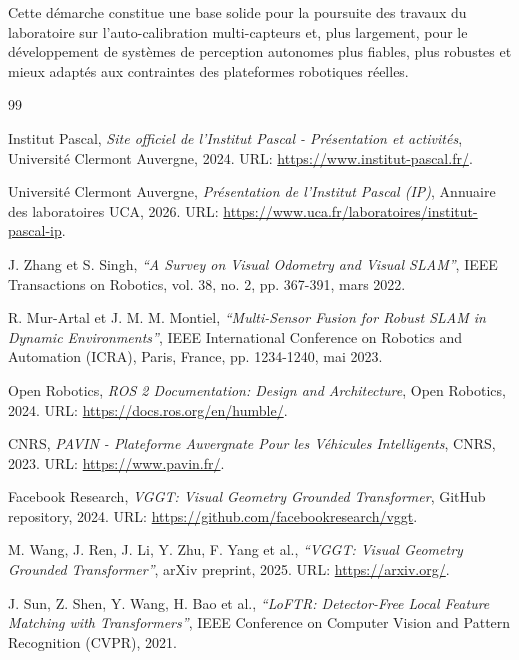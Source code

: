 \documentclass[12pt,a4paper,oneside]{report}
\begin{document}
\hspace*{.3cm}Cette démarche constitue une base solide pour la poursuite des travaux du laboratoire sur l'auto-calibration multi-capteurs et, plus largement, pour le développement de systèmes de perception autonomes plus fiables, plus robustes et mieux adaptés aux contraintes des plateformes robotiques réelles.


\begin{thebibliography}{99}

Institut Pascal, \textit{Site officiel de l'Institut Pascal - Présentation et activités}, Université Clermont Auvergne, 2024. URL: \url{https://www.institut-pascal.fr/}.

Université Clermont Auvergne, \textit{Présentation de l'Institut Pascal (IP)}, Annuaire des laboratoires UCA, 2026. URL: \url{https://www.uca.fr/laboratoires/institut-pascal-ip}.

J. Zhang et S. Singh, \textit{``A Survey on Visual Odometry and Visual SLAM''}, IEEE Transactions on Robotics, vol. 38, no. 2, pp. 367-391, mars 2022.

R. Mur-Artal et J. M. M. Montiel, \textit{``Multi-Sensor Fusion for Robust SLAM in Dynamic Environments''}, IEEE International Conference on Robotics and Automation (ICRA), Paris, France, pp. 1234-1240, mai 2023.

Open Robotics, \textit{ROS 2 Documentation: Design and Architecture}, Open Robotics, 2024. URL: \url{https://docs.ros.org/en/humble/}.

CNRS, \textit{PAVIN - Plateforme Auvergnate Pour les Véhicules Intelligents}, CNRS, 2023. URL: \url{https://www.pavin.fr/}.

Facebook Research, \textit{VGGT: Visual Geometry Grounded Transformer}, GitHub repository, 2024. URL: \url{https://github.com/facebookresearch/vggt}.

M. Wang, J. Ren, J. Li, Y. Zhu, F. Yang et al., \textit{``VGGT: Visual Geometry Grounded Transformer''}, arXiv preprint, 2025. URL: \url{https://arxiv.org/}.

J. Sun, Z. Shen, Y. Wang, H. Bao et al., \textit{``LoFTR: Detector-Free Local Feature Matching with Transformers''}, IEEE Conference on Computer Vision and Pattern Recognition (CVPR), 2021.


\end{thebibliography}
\end{document}
